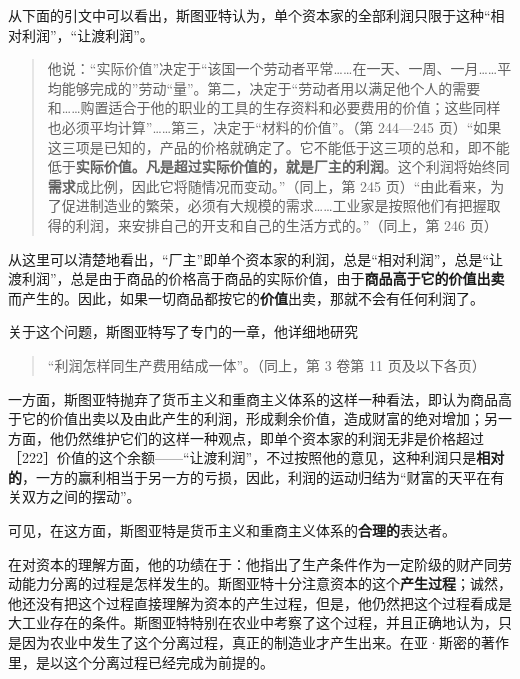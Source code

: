 从下面的引文中可以看出，斯图亚特认为，单个资本家的全部利润只限于这种“相对利润”，“让渡利润”。

\begin{quote}他说：“实际价值”决定于“该国一个劳动者平常……在一天、一周、一月……平均能够完成的”劳动“量”。第二，决定于“劳动者用以满足他个人的需要和……购置适合于他的职业的工具的生存资料和必要费用的价值；这些同样也必须平均计算”……第三，决定于“材料的价值”。（第 244—245 页）“如果这三项是已知的，产品的价格就确定了。它不能低于这三项的总和，即不能低于\textbf{实际价值。凡是超过实际价值的，就是厂主的利润}。这个利润将始终同\textbf{需求}成比例，因此它将随情况而变动。”（同上，第 245 页）“由此看来，为了促进制造业的繁荣，必须有大规模的需求……工业家是按照他们有把握取得的利润，来安排自己的开支和自己的生活方式的。”（同上，第 246 页）\end{quote}

从这里可以清楚地看出，“厂主”即单个资本家的利润，总是“相对利润”，总是“让渡利润”，总是由于商品的价格高于商品的实际价值，由于\textbf{商品高于它的价值出卖}而产生的。因此，如果一切商品都按它的\textbf{价值}出卖，那就不会有任何利润了。

关于这个问题，斯图亚特写了专门的一章，他详细地研究

\begin{quote}“利润怎样同生产费用结成一体”。（同上，第 3 卷第 11 页及以下各页）\end{quote}

一方面，斯图亚特抛弃了货币主义和重商主义体系的这样一种看法，即认为商品高于它的价值出卖以及由此产生的利润，形成剩余价值，造成财富的绝对增加；另一方面，他仍然维护它们的这样一种观点，即单个资本家的利润无非是价格超过［222］价值的这个余额——“让渡利润”，不过按照他的意见，这种利润只是\textbf{相对的}，一方的赢利相当于另一方的亏损，因此，利润的运动归结为“财富的天平在有关双方之间的摆动”。

可见，在这方面，斯图亚特是货币主义和重商主义体系的\textbf{合理的}表达者。

在对资本的理解方面，他的功绩在于：他指出了生产条件作为一定阶级的财产同劳动能力分离的过程是怎样发生的。斯图亚特十分注意资本的这个\textbf{产生过程}；诚然，他还没有把这个过程直接理解为资本的产生过程，但是，他仍然把这个过程看成是大工业存在的条件。斯图亚特特别在农业中考察了这个过程，并且正确地认为，只是因为农业中发生了这个分离过程，真正的制造业才产生出来。在亚·斯密的著作里，是以这个分离过程已经完成为前提的。

